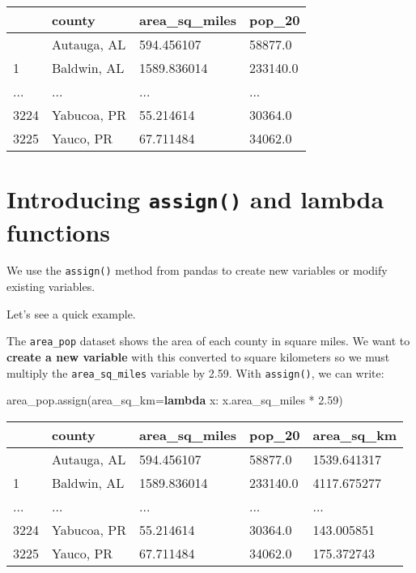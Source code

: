 \documentclass[
  letterpaper,
  DIV=11,
  numbers=noendperiod]{scrreprt}
\newenvironment{Shaded}{\begin{snugshade}}{\end{snugshade}}
\newcommand{\FloatTok}[1]{\textcolor[rgb]{0.68,0.00,0.00}{#1}}
\newcommand{\KeywordTok}[1]{\textcolor[rgb]{0.00,0.23,0.31}{\textbf{#1}}}
\newcommand{\NormalTok}[1]{\textcolor[rgb]{0.00,0.23,0.31}{#1}}
\newcommand{\OperatorTok}[1]{\textcolor[rgb]{0.37,0.37,0.37}{#1}}
\begin{document}
\begin{longtable}[]{@{}llll@{}}
\toprule\noalign{}
& county & area\_sq\_miles & pop\_20 \\
\midrule\noalign{}
\endhead
\bottomrule\noalign{}
\endlastfoot
0 & Autauga, AL & 594.456107 & 58877.0 \\
1 & Baldwin, AL & 1589.836014 & 233140.0 \\
... & ... & ... & ... \\
3224 & Yabucoa, PR & 55.214614 & 30364.0 \\
3225 & Yauco, PR & 67.711484 & 34062.0 \\
\end{longtable}

\section{\texorpdfstring{Introducing \texttt{assign()} and lambda
functions}{Introducing assign() and lambda functions}}\label{introducing-assign-and-lambda-functions}

We use the \texttt{assign()} method from pandas to create new variables
or modify existing variables.

Let's see a quick example.

The \texttt{area\_pop} dataset shows the area of each county in square
miles. We want to \textbf{create a new variable} with this converted to
square kilometers so we must multiply the \texttt{area\_sq\_miles}
variable by 2.59. With \texttt{assign()}, we can write:

\begin{Shaded}
\begin{Highlighting}[]
\NormalTok{area\_pop.assign(area\_sq\_km}\OperatorTok{=}\KeywordTok{lambda}\NormalTok{ x: x.area\_sq\_miles }\OperatorTok{*} \FloatTok{2.59}\NormalTok{)}
\end{Highlighting}
\end{Shaded}

\begin{longtable}[]{@{}lllll@{}}
\toprule\noalign{}
& county & area\_sq\_miles & pop\_20 & area\_sq\_km \\
\midrule\noalign{}
\endhead
\bottomrule\noalign{}
\endlastfoot
0 & Autauga, AL & 594.456107 & 58877.0 & 1539.641317 \\
1 & Baldwin, AL & 1589.836014 & 233140.0 & 4117.675277 \\
... & ... & ... & ... & ... \\
3224 & Yabucoa, PR & 55.214614 & 30364.0 & 143.005851 \\
3225 & Yauco, PR & 67.711484 & 34062.0 & 175.372743 \\
\end{longtable}
\end{document}

